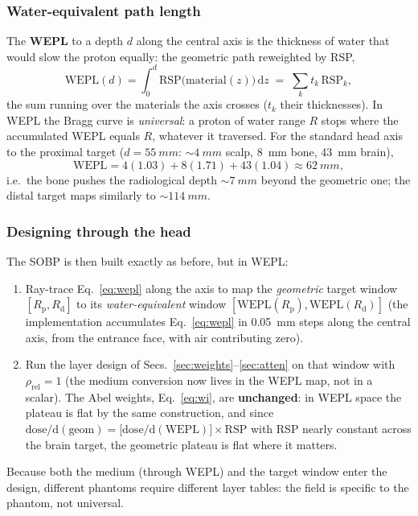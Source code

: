 \documentclass[11pt]{article}
\newcommand{\Rd}{R_{\mathrm d}}
\newcommand{\Rp}{R_{\mathrm p}}
\begin{document}
\subsubsection{Water-equivalent path length}
The \textbf{WEPL} to a depth $d$ along the central axis is the thickness of water
that would slow the proton equally: the geometric path reweighted by RSP,
\begin{equation}
\mathrm{WEPL}(d)=\int_0^{d}\mathrm{RSP}\big(\mathrm{material}(z)\big)\,\mathrm dz
\;=\;\sum_k t_k\,\mathrm{RSP}_k ,
\label{eq:wepl}
\end{equation}
the sum running over the materials the axis crosses ($t_k$ their thicknesses). In
WEPL the Bragg curve is \emph{universal}: a proton of water range $R$ stops where
the accumulated WEPL equals $R$, whatever it traversed. For the standard head axis
to the proximal target ($d=\SI{55}{mm}$: ${\sim}\SI{4}{mm}$ scalp, \SI{8}{mm}
bone, \SI{43}{mm} brain),
\[
\mathrm{WEPL}=4(1.03)+8(1.71)+43(1.04)\approx\SI{62}{mm},
\]
i.e.\ the bone pushes the radiological depth ${\sim}\SI{7}{mm}$ beyond the
geometric one; the distal target maps similarly to ${\sim}\SI{114}{mm}$.

\subsubsection{Designing through the head}
The SOBP is then built exactly as before, but in WEPL:
\begin{enumerate}[nosep]
\item Ray-trace Eq.~\eqref{eq:wepl} along the axis to map the \emph{geometric}
target window $[\Rp,\Rd]$ to its \emph{water-equivalent} window
$[\mathrm{WEPL}(\Rp),\mathrm{WEPL}(\Rd)]$ (the implementation accumulates
Eq.~\eqref{eq:wepl} in \SI{0.05}{mm} steps along the central axis, from the
entrance face, with air contributing zero).
\item Run the layer design of Secs.~\ref{sec:weights}--\ref{sec:atten} on that
window with $\rho_{\mathrm{rel}}=1$ (the medium conversion now lives in the WEPL
map, not in a scalar). The Abel weights, Eq.~\eqref{eq:wi}, are \textbf{unchanged}:
in WEPL space the plateau is flat by the same construction, and since
$\mathrm{dose}/\mathrm d(\text{geom})=\big[\mathrm{dose}/\mathrm d(\mathrm{WEPL})\big]
\times\mathrm{RSP}$ with RSP nearly constant across the brain target, the geometric
plateau is flat where it matters.
\end{enumerate}
Because both the medium (through WEPL) and the target window enter the design,
different phantoms require different layer tables: the field is specific to the
phantom, not universal.
\end{document}
